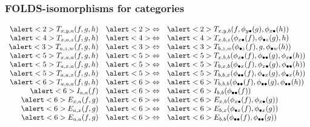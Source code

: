 \documentclass{beamer}
\begin{document}
\begin{frame}[t]
  \frametitle{FOLDS-isomorphisms for categories}
  \[
  \begin{array}{rcl}
    \alert<2>{T_{x,y,a}(f,g,h)} & \alert<2>{\Leftrightarrow}& \alert<2>{T_{x,y,b}(f,\phi_{y\bullet}(g),\phi_{x\bullet}(h))}\\
    \alert<4>{T_{x,a,z}(f,g,h)} &\alert<4>{\Leftrightarrow}& \alert<4>{T_{x,b,z}(\phi_{x\bullet}(f),\phi_{\bullet z}(g),h)}\\
    \alert<3>{T_{a,z,w}(f,g,h)} &\alert<3>{\Leftrightarrow}& \alert<3>{T_{b,z,w}(\phi_{\bullet z}(f),g,\phi_{\bullet w}(h))}\\
    \alert<5>{T_{x,a,a}(f,g,h)} &\alert<5>{\Leftrightarrow}& \alert<5>{T_{x,b,b}(\phi_{x\bullet}(f),\phi_{\bullet\bullet}(g),\phi_{x\bullet}(h))}\\
    \alert<5>{T_{a,x,a}(f,g,h)} &\alert<5>{\Leftrightarrow}& \alert<5>{T_{b,x,b}(\phi_{\bullet x}(f),\phi_{x\bullet}(g),\phi_{\bullet\bullet}(h))}\\
    \alert<5>{T_{a,a,x}(f,g,h)} &\alert<5>{\Leftrightarrow}& \alert<5>{T_{b,b,x}(\phi_{\bullet\bullet}(f),\phi_{\bullet x}(g),\phi_{\bullet x}(h))}\\
    \alert<6>{T_{a,a,a}(f,g,h)} &\alert<6>{\Leftrightarrow}& \alert<6>{T_{b,b,b}(\phi_{\bullet\bullet}(f),\phi_{\bullet\bullet}(g),\phi_{\bullet\bullet}(h))}\\
    \alert<6>{I_{a,a}(f) }& \alert<6>{\Leftrightarrow}& \alert<6>{I_{b,b}(\phi_{\bullet\bullet}(f))}\\
    \alert<6>{E_{x,a}(f,g) }&\alert<6>{\Leftrightarrow}& \alert<6>{E_{x,b}(\phi_{x\bullet }(f),\phi_{x\bullet}(g))}\\
    \alert<6>{E_{a,x}(f,g) }&\alert<6>{\Leftrightarrow}& \alert<6>{E_{b,x}(\phi_{\bullet x}(f),\phi_{\bullet x}(g))}\\
    \alert<6>{E_{a,a}(f,g) }&\alert<6>{\Leftrightarrow}& \alert<6>{E_{b,b}(\phi_{\bullet \bullet}(f),\phi_{\bullet \bullet}(g))}
  \end{array}
  \]
  \vspace{1mm}
  \begin{center}
  \end{center}
\end{frame}
\end{document}
